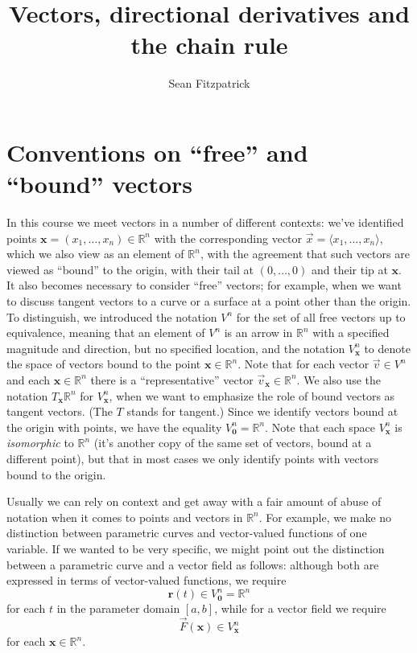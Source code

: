 \documentclass[12pt,letterpaper]{article}
\title{Vectors, directional derivatives and the chain rule}
\author{Sean Fitzpatrick}
\newcommand{\R}{\mathbb{R}}
\newcommand{\x}{\mathbf{x}}
\begin{document}
\maketitle

\section{Conventions on ``free'' and ``bound'' vectors}
In this course we meet vectors in a number of different contexts: we've identified points $\x = (x_1,\ldots, x_n)\in \mathbb{R}^n$ with the corresponding vector $\vec{x} = \langle x_1,\ldots, x_n\rangle$, which we also view as an element of $\R^n$, with the agreement that such vectors are viewed as ``bound'' to the origin, with their tail at $(0,\ldots, 0)$ and their tip at $\x$. It also becomes necessary to consider ``free'' vectors; for example, when we want to discuss tangent vectors to a curve or a surface at a point other than the origin. To distinguish, we introduced the notation $V^n$ for the set of all free vectors up to equivalence, meaning that an element of $V^n$ is an arrow in $\R^n$ with a specified magnitude and direction, but no specified location, and the notation $V^n_{\x}$ to denote the space of vectors bound to the point $\x\in \R^n$. Note that for each vector $\vec{v}\in V^n$ and each $\x\in\R^n$ there is a ``representative'' vector $\vec{v}_{\x}\in\R^n$. We also use the notation $T_{\x}\R^n$ for $V^n_{\x}$, when we want to emphasize the role of bound vectors as tangent vectors. (The $T$ stands for tangent.) Since we identify vectors bound at the origin with points, we have the equality $V^n_{\mathbf{0}} = \R^n$. Note that each space $V^n_{\x}$ is {\em isomorphic} to $\R^n$ (it's another copy of the same set of vectors, bound at a different point), but that in most cases we only identify points with vectors bound to the origin.

Usually we can rely on context and get away with a fair amount of abuse of notation when it comes to points and vectors in $\R^n$. For example, we make no distinction between parametric curves and vector-valued functions of one variable. If we wanted to be very specific, we might point out the distinction between a parametric curve and a vector field as follows: although both are expressed in terms of vector-valued functions, we require
\[
\mathbf{r}(t) \in V^n_{\mathbf{0}} = \R^n
\]
for each $t$ in the parameter domain $[a,b]$, while for a vector field we require
\[
\vec{F}(\mathbf{x}) \in V^n_{\x}
\]
for each $\x\in \R^n$. 
\end{document}
